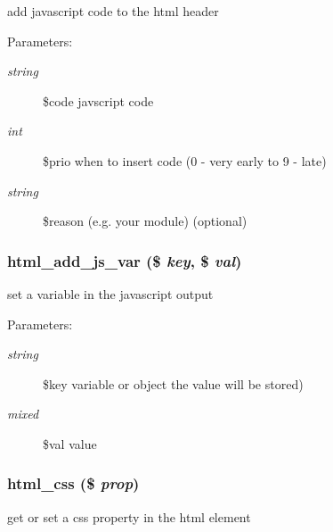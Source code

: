 add javascript code to the html header

\begin{Desc}
\item[Parameters:]
\begin{description}
\item[{\em string}]\$code javscript code \item[{\em int}]\$prio when to insert code (0 - very early to 9 - late) \item[{\em string}]\$reason (e.g. your module) (optional) \end{description}
\end{Desc}
\hypertarget{html_8inc_8php_84769b7fe7b5454ff46534d0577eb54c}{
\subsubsection[{html\_\-add\_\-js\_\-var}]{\setlength{\rightskip}{0pt plus 5cm}html\_\-add\_\-js\_\-var (\$ {\em key}, \/  \$ {\em val})}}
\label{html_8inc_8php_84769b7fe7b5454ff46534d0577eb54c}


set a variable in the javascript output

\begin{Desc}
\item[Parameters:]
\begin{description}
\item[{\em string}]\$key variable or object the value will be stored) \item[{\em mixed}]\$val value \end{description}
\end{Desc}
\hypertarget{html_8inc_8php_d52276fa2a03df7342ba4b8e6a334ce0}{
\subsubsection[{html\_\-css}]{\setlength{\rightskip}{0pt plus 5cm}html\_\-css (\$ {\em prop})}}
\label{html_8inc_8php_d52276fa2a03df7342ba4b8e6a334ce0}


get or set a css property in the html element

